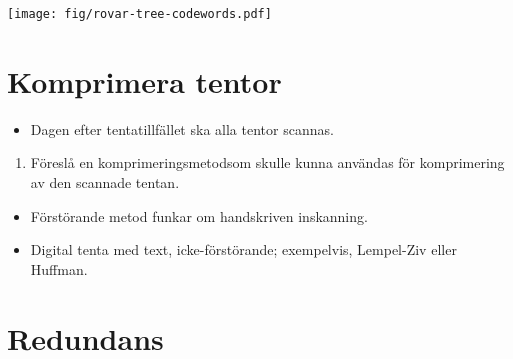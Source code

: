 \begin{frame}
  \centering
  \texttt{[image: fig/rovar-tree-codewords.pdf]}
\end{frame}

\section{Komprimera tentor}

\begin{frame}
  \begin{exercise}
    \begin{itemize}
      \item Dagen efter tentatillfället ska alla tentor scannas.
    \end{itemize}
    \begin{enumerate}
      \item Föreslå en komprimeringsmetodsom skulle kunna användas för 
        komprimering av den scannade tentan.
    \end{enumerate}
  \end{exercise}
\end{frame}

\begin{frame}
  \begin{solution}
    \begin{itemize}
      \item Förstörande metod funkar om handskriven inskanning.
      \item Digital tenta med text, icke-förstörande; exempelvis, Lempel-Ziv 
        eller Huffman.
    \end{itemize}
  \end{solution}
\end{frame}

\section{Redundans}

